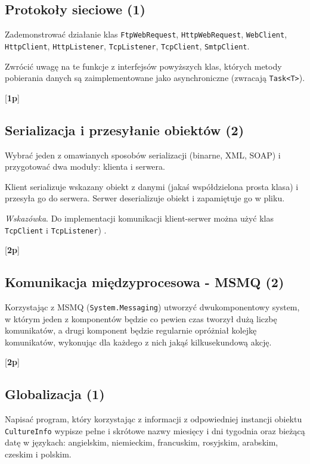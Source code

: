\subsection{Protokoły sieciowe (1)}

    Zademonstrować działanie klas {\tt FtpWebRequest}, {\tt HttpWebRequest}, 
	{\tt WebClient}, {\tt HttpClient}, {\tt HttpListener},
\label{protokoly_sieciowe}	
    {\tt TcpListener}, {\tt TcpClient}, {\tt SmtpClient}.
	
	Zwrócić uwagę na te funkcje z interfejsów powyższych klas, których metody pobierania danych są zaimplementowane jako asynchroniczne (zwracają {\tt Task<T>}).

    [{\bf 1p}]

\subsection{Serializacja i przesyłanie obiektów (2)}

    Wybrać jeden z omawianych sposobów serializacji (binarne, XML, SOAP) i przygotować dwa moduły: klienta i serwera.
	
	Klient serializuje wskazany obiekt z danymi (jakaś współdzielona prosta klasa) i przesyła go do serwera. Serwer deserializuje obiekt i zapamiętuje go w pliku.
	
	{\em Wskazówka}. Do implementacji komunikacji klient-serwer można użyć klas 
    {\tt TcpClient} i {\tt TcpListener}) .
    
    [{\bf 2p}]

\subsection{Komunikacja międzyprocesowa - MSMQ (2)}

    Korzystając z MSMQ ({\tt System.Messaging}) utworzyć
\label{msmq}	
    dwukomponentowy system, w którym jeden z komponentów będzie
    co pewien czas tworzył dużą liczbę komunikatów, a drugi komponent
    będzie regularnie opróżniał kolejkę komunikatów, wykonując dla
    każdego z nich jakąś kilkusekundową akcję.
    
    [{\bf 2p}]

\subsection{Globalizacja (1)}

    Napisać program, który korzystając z informacji z odpowiedniej instancji obiektu {\tt CultureInfo} 
\label{globaliazcja}	
    wypisze pełne i skrótowe nazwy miesięcy i dni tygodnia oraz
    bieżącą datę w językach: 
    angielskim, niemieckim, francuskim, rosyjskim, arabskim, czeskim i polskim.
    
